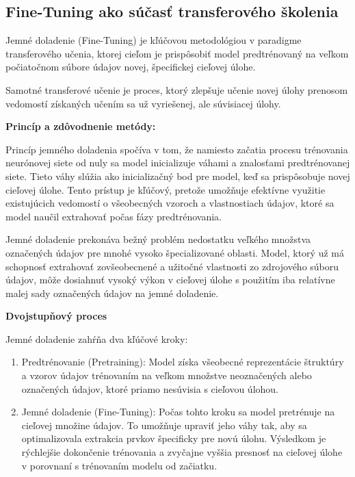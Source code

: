 \documentclass[]{tukediphc}
\begin{document}
\subsection{Fine-Tuning ako súčasť transferového školenia}
Jemné doladenie (Fine-Tuning) je kľúčovou metodológiou v paradigme transferového učenia, ktorej cieľom je prispôsobiť model predtrénovaný na veľkom počiatočnom súbore údajov novej, špecifickej cieľovej úlohe.

Samotné transferové učenie je proces, ktorý zlepšuje učenie novej úlohy prenosom vedomostí získaných učením sa už vyriešenej, ale súvisiacej úlohy.

\textbf{Princíp a zdôvodnenie metódy:}

Princíp jemného doladenia spočíva v tom, že namiesto začatia procesu trénovania neurónovej siete od nuly sa model inicializuje váhami a znalosťami predtrénovanej siete. Tieto váhy slúžia ako inicializačný bod pre model, keď sa prispôsobuje novej cieľovej úlohe. Tento prístup je kľúčový, pretože umožňuje efektívne využitie existujúcich vedomostí o všeobecných vzoroch a vlastnostiach údajov, ktoré sa model naučil extrahovať počas fázy predtrénovania. 

Jemné doladenie prekonáva bežný problém nedostatku veľkého množstva označených údajov pre mnohé vysoko špecializované oblasti. Model, ktorý už má schopnosť extrahovať zovšeobecnené a užitočné vlastnosti zo zdrojového súboru údajov, môže dosiahnuť vysoký výkon v cieľovej úlohe s použitím iba relatívne malej sady označených údajov na jemné doladenie.\cite{researchgate:fine_tuning_transfer_learning} 

\textbf{Dvojstupňový proces}

Jemné doladenie zahŕňa dva kľúčové kroky:

\begin{enumerate}
 \item Predtrénovanie (Pretraining): Model získa všeobecné reprezentácie štruktúry a vzorov údajov trénovaním na veľkom množstve neoznačených alebo označených údajov, ktoré priamo nesúvisia s cieľovou úlohou.

\item Jemné doladenie (Fine-Tuning): Počas tohto kroku sa model pretrénuje na cieľovej množine údajov. To umožňuje upraviť jeho váhy tak, aby sa optimalizovala extrakcia prvkov špecificky pre novú úlohu.\cite{researchgate:fine_tuning_transfer_learning} Výsledkom je rýchlejšie dokončenie trénovania a zvyčajne vyššia presnosť na cieľovej úlohe v porovnaní s trénovaním modelu od začiatku. 
\end{enumerate}
\end{document}
